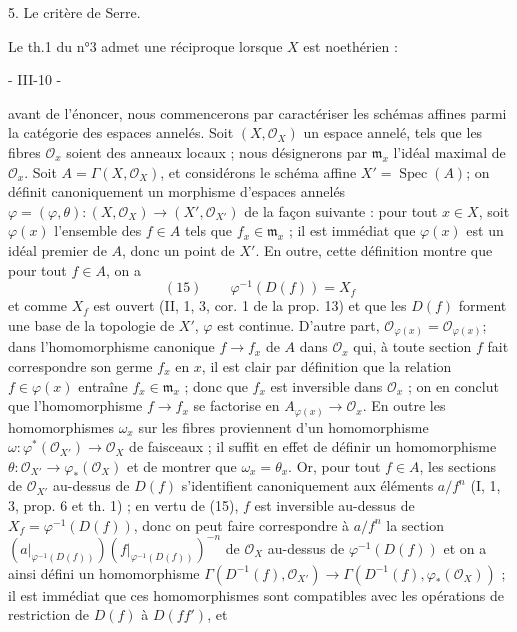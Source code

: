 5. Le critère de Serre.

Le th.1 du n°3 admet une réciproque lorsque $X$ est noethérien :

\newpage


- III-10 -

avant de l'énoncer, nous commencerons par caractériser les schémas affines parmi la catégorie des espaces annelés. Soit $(X, \mathcal{O}_X)$ un espace annelé, tels que les fibres $\mathcal{O}_x$ soient des anneaux locaux ; nous désignerons par $\mathfrak{m}_x$ l'idéal maximal de $\mathcal{O}_x$. Soit $A = \Gamma(X, \mathcal{O}_X)$, et considérons le schéma affine $X' = \operatorname{Spec}(A)$; on définit canoniquement un morphisme d'espaces annelés $\varphi = (\varphi, \theta) : (X, \mathcal{O}_X) \to (X', \mathcal{O}_{X'})$ de la façon suivante : pour tout $x \in X$, soit $\varphi(x)$ l'ensemble des $f \in A$ tels que $f_x \in \mathfrak{m}_x$ ; il est immédiat que $\varphi(x)$ est un idéal premier de $A$, donc un point de $X'$. En outre, cette définition montre que pour tout $f \in A$, on a
$$(15) \qquad \varphi^{-1}(D(f)) = X_f$$
et comme $X_f$ est ouvert (II, 1, 3, cor. 1 de la prop. 13) et que les $D(f)$ forment une base de la topologie de $X'$, $\varphi$ est continue. D'autre part, $\mathcal{O}_{\varphi(x)} = \mathcal{O}_{\varphi(x)}$; dans l'homomorphisme canonique $f \to f_x$ de $A$ dans $\mathcal{O}_x$ qui, à toute section $f$ fait correspondre son germe $f_x$ en $x$, il est clair par définition que la relation $f \in \varphi(x)$ entraîne $f_x \in \mathfrak{m}_x$ ; donc que $f_x$ est inversible dans $\mathcal{O}_x$ ; on en conclut que l'homomorphisme $f \to f_x$ se factorise en $A_{\varphi(x)} \to \mathcal{O}_x$. En outre les homomorphismes $\omega_x$ sur les fibres proviennent d'un homomorphisme $\omega : \varphi^*(\mathcal{O}_{X'}) \to \mathcal{O}_X$ de faisceaux ; il suffit en effet de définir un homomorphisme $\theta : \mathcal{O}_{X'} \to \varphi_*(\mathcal{O}_X)$ et de montrer que $\omega_x = \theta_x$. Or, pour tout $f \in A$, les sections de $\mathcal{O}_{X'}$ au-dessus de $D(f)$ s'identifient canoniquement aux éléments $a/f^n$ (I, 1, 3, prop. 6 et th. 1) ; en vertu de (15), $f$ est inversible au-dessus de $X_f = \varphi^{-1}(D(f))$, donc on peut faire correspondre à $a/f^n$ la section $(a|_{\varphi^{-1}(D(f))})(f|_{\varphi^{-1}(D(f))})^{-n}$ de $\mathcal{O}_X$ au-dessus de $\varphi^{-1}(D(f))$ et on a ainsi défini un homomorphisme $\Gamma(D^{-1}(f), \mathcal{O}_{X'}) \to \Gamma(D^{-1}(f), \varphi_*(\mathcal{O}_X))$ ; il est immédiat que ces homomorphismes sont compatibles avec les opérations de restriction de $D(f)$ à $D(ff')$, et

